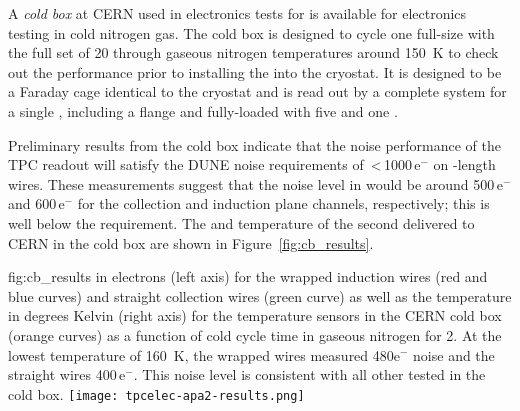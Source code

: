 A \textit{cold box} at CERN used in electronics tests for  is available for electronics testing in cold nitrogen gas. The cold box is designed to cycle one full-size  with the full set of \num{20}  through gaseous nitrogen temperatures around \SI{150}{K} to check out the  performance prior to installing the  into the  cryostat. It is designed to be a Faraday cage identical to the  cryostat and is read out by a complete  system for a single , including a  flange and fully-loaded  with five  and one .

Preliminary results from the  cold box indicate that
the noise performance of the TPC readout will satisfy the DUNE  noise requirements of
\,<\,\num{1000}\,e$^-$ on -length wires. These measurements suggest that the noise level in
\lar would be around \num{500}\,e$^-$ and \num{600}\,e$^-$ for the collection and induction plane channels,
respectively; this is well below the requirement.  The  and temperature of the second 
 delivered to CERN in the cold box are shown in Figure~\ref{fig:cb_results}.

\begin{dunefigure}
{fig:cb_results}
{ in electrons (left axis) for the wrapped induction wires (red and blue curves) and 
straight collection wires (green curve) as well as the temperature in degrees Kelvin (right axis) for the temperature
sensors in the CERN cold box (orange curves) as a function of cold cycle time in gaseous nitrogen for  2. 
At the lowest temperature of \SI{160}{K}, the wrapped wires measured 480e$^-$ noise and the straight 
wires \num{400}\,e$^-$. This noise level is consistent with all other   tested in the cold box.}
\texttt{[image: tpcelec-apa2-results.png]}
\end{dunefigure}
